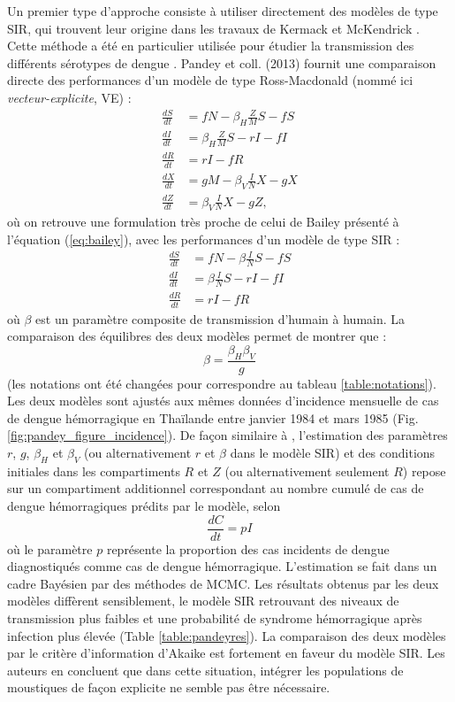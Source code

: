 Un premier type d'approche consiste à utiliser directement des modèles de type SIR, qui trouvent leur origine dans les travaux de Kermack et McKendrick \cite{kermack1927contributions}.
Cette méthode a été en particulier utilisée pour étudier la transmission des différents sérotypes de dengue \cite{ferguson1999effect,cummings2005dynamic}.
Pandey et coll. (2013) \cite{pandey2013comparing} fournit une comparaison directe des performances d'un modèle de type Ross-Macdonald (nommé ici {\em vecteur-explicite}, VE) :
\begin{align}
\label{eq:pandeyve}
\frac{dS}{dt} &= fN - \beta_H\frac{Z}{M}S - fS \\ \nonumber
\frac{dI}{dt} &= \beta_H\frac{Z}{M}S - rI - fI \\ \nonumber
\frac{dR}{dt} &= rI - fR \\  \nonumber
\frac{dX}{dt} &= gM - \beta_V\frac{I}{N}X - gX \\ \nonumber
\frac{dZ}{dt} &= \beta_V\frac{I}{N}X - gZ,
\end{align}
où on retrouve une formulation très proche de celui de Bailey présenté à l'équation (\ref{eq:bailey}), avec les performances d'un modèle de type SIR :
\begin{align}
\label{eq:pandeyvi}
\frac{dS}{dt} &= fN - \beta\frac{I}{N}S - fS \\ \nonumber
\frac{dI}{dt} &= \beta\frac{I}{N}S - rI - fI \\ \nonumber
\frac{dR}{dt} &= rI - fR
\end{align}
où $\beta$ est un paramètre composite de transmission d'humain à humain.
La comparaison des équilibres des deux modèles permet de montrer que :
\begin{equation}
\beta = \frac{\beta_H\beta_V}{g}
\end{equation}
(les notations ont été changées pour correspondre au tableau \ref{table:notations}).
Les deux modèles sont ajustés aux mêmes données d'incidence mensuelle de cas de dengue hémorragique en Thaïlande entre janvier 1984 et mars 1985 (Fig. \ref{fig:pandey_figure_incidence}).
De façon similaire à \cite{kucharski_transmission_2016}, l'estimation des paramètres $r$, $g$, $\beta_H$ et $\beta_V$ (ou alternativement $r$ et $\beta$ dans le modèle SIR) et des conditions initiales dans  les compartiments $R$ et $Z$ (ou alternativement seulement $R$) repose sur un compartiment additionnel correspondant au nombre cumulé de cas de dengue hémorragiques prédits par le modèle, selon
\begin{equation}
\frac{dC}{dt} = pI
\end{equation}
où le paramètre $p$ représente la proportion des cas incidents de dengue diagnostiqués comme cas de dengue hémorragique.
L'estimation se fait dans un cadre Bayésien par des méthodes de MCMC.
Les résultats obtenus par les deux modèles diffèrent sensiblement, le modèle SIR retrouvant des niveaux de transmission plus faibles et une probabilité de syndrome hémorragique après infection plus élevée (Table \ref{table:pandeyres}).
La comparaison des deux modèles par le critère d'information d'Akaike est fortement en faveur du modèle SIR.
Les auteurs en concluent que dans cette situation, intégrer les populations de moustiques de façon explicite ne semble pas être nécessaire.


